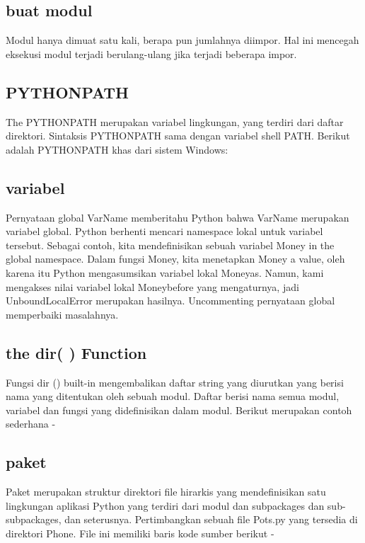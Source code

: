 \subsection{buat modul}Modul hanya dimuat satu kali, berapa pun jumlahnya diimpor. Hal ini mencegah eksekusi modul terjadi berulang-ulang jika terjadi beberapa impor.
 

\subsection{PYTHONPATH} 
The PYTHONPATH merupakan variabel lingkungan, yang terdiri dari daftar direktori. Sintaksis PYTHONPATH sama dengan variabel shell PATH. 
Berikut adalah PYTHONPATH khas dari sistem Windows:
 
\subsection{variabel}
Pernyataan global VarName memberitahu Python bahwa VarName merupakan variabel global. Python berhenti mencari namespace lokal untuk variabel tersebut. 
Sebagai contoh, kita mendefinisikan sebuah variabel Money in the global namespace. Dalam fungsi Money, kita menetapkan Money a value, oleh karena itu Python mengasumsikan variabel lokal Moneyas. Namun, kami mengakses nilai variabel lokal Moneybefore yang mengaturnya, jadi UnboundLocalError merupakan hasilnya. Uncommenting pernyataan global memperbaiki masalahnya.
 
\subsection{the dir( ) Function}
Fungsi dir () built-in mengembalikan daftar string yang diurutkan yang berisi nama yang ditentukan oleh sebuah modul.
Daftar berisi nama semua modul, variabel dan fungsi yang didefinisikan dalam modul. Berikut merupakan contoh sederhana - 



\subsection{paket}
Paket merupakan struktur direktori file hirarkis yang mendefinisikan satu lingkungan aplikasi Python yang terdiri dari modul dan subpackages dan sub-subpackages, dan seterusnya.
Pertimbangkan sebuah file Pots.py yang tersedia di direktori Phone. File ini memiliki baris kode sumber berikut -

